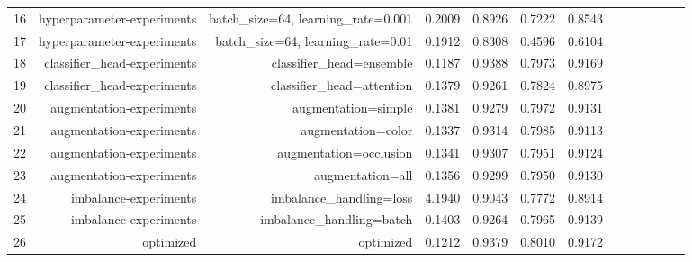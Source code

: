 \begin{table}[h!]
\begin{tabular}{lrrrrrrrrrrrr}
16 & hyperparameter-experiments & batch\_size=64, learning\_rate=0.001 & 0.2009 & 0.8926 & 0.7222 & 0.8543 \\
17 & hyperparameter-experiments & batch\_size=64, learning\_rate=0.01 & 0.1912 & 0.8308 & 0.4596 & 0.6104 \\
18 & classifier\_head-experiments & classifier\_head=ensemble & 0.1187 & 0.9388 & 0.7973 & 0.9169 \\
19 & classifier\_head-experiments & classifier\_head=attention & 0.1379 & 0.9261 & 0.7824 & 0.8975 \\
20 & augmentation-experiments & augmentation=simple & 0.1381 & 0.9279 & 0.7972 & 0.9131 \\
21 & augmentation-experiments & augmentation=color & 0.1337 & 0.9314 & 0.7985 & 0.9113 \\
22 & augmentation-experiments & augmentation=occlusion & 0.1341 & 0.9307 & 0.7951 & 0.9124 \\
23 & augmentation-experiments & augmentation=all & 0.1356 & 0.9299 & 0.7950 & 0.9130 \\
24 & imbalance-experiments & imbalance\_handling=loss & 4.1940 & 0.9043 & 0.7772 & 0.8914 \\
25 & imbalance-experiments & imbalance\_handling=batch & 0.1403 & 0.9264 & 0.7965 & 0.9139 \\
26 & optimized & optimized & 0.1212 & 0.9379 & 0.8010 & 0.9172 \\
\end{tabular}
\end{table}
